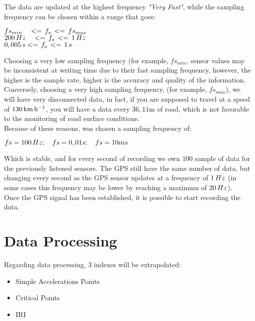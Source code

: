 \documentclass[tesi]{subfiles}
\begin{document}
\noindent The data are updated at the highest frequency \textit{"Very Fast"}, while the sampling frequency can be chosen within a range that goes:


\begin{center}
$fs_{min} \quad <= \thinspace f_{s} \thinspace <= \thinspace fs_{max}$\\
$200 \thinspace Hz \quad <= \thinspace f_{s} \thinspace <= \thinspace 1 \thinspace Hz$\\
$0,005 \thinspace s <= \thinspace f_{s} \thinspace <= \thinspace 1 \thinspace s $
\end{center}


\noindent Choosing a very low sampling frequency (for example, $fs_{min}$, sensor values may be inconsistent at writing time due to their fast sampling frequency, however, the higher is the sample rate, higher is the accuracy and quality of the information.\\
Conversely, choosing a very high sampling frequency, (for example, $fs_{max}$), we will have very disconnected data, in fact, if you are supposed to travel at a speed of $130 \thinspace \si{\km\per\hour}$, you will have a data every $36,11  \si{\meter}$ of road, which is not favorable to the monitoring of road surface conditions.\\
Because of these reasons, was chosen a sampling frequency of:
\begin{center}
$fs = 100 \thinspace Hz; \quad fs = 0,01s; \quad fs = 10ms$
\end{center}

\noindent Which is stable, and for every second of recording we own $100$ sample of data for the previously listened sensors. The GPS still have the same number of data, but changing every second as the GPS sensor updates at a frequency of $1 \thinspace Hz$ (in some cases this frequency may be lower by reaching a maximum of $20 \thinspace Hz$).\\
Once the GPS signal has been established, it is possible to start recording the data.
 
 
 
 \section{Data Processing}\label{sc:Data Processing}
 Regarding data processing, 3 indexes will be extrapolated:
 
 \begin{itemize}
 \item Simple Accelerations Points
 \item Critical Points
 \item IRI
 \end{itemize}
\end{document}
